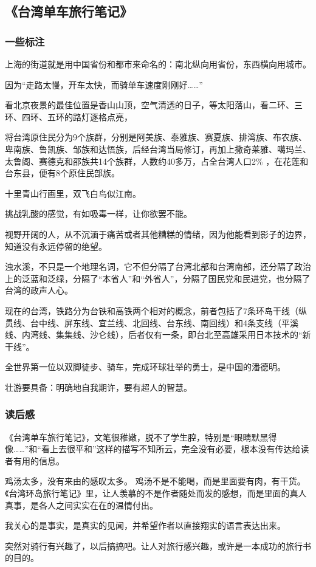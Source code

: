 \subsection{《台湾单车旅行笔记》}
\subsubsection{一些标注}

上海的街道就是用中国省份和都市来命名的：南北纵向用省份，东西横向用城市。

因为“走路太慢，开车太快，而骑单车速度刚刚好……”

看北京夜景的最佳位置是香山山顶，空气清透的日子，等太阳落山，看二环、三环、四环、五环的路灯逐格点亮，

将台湾原住民分为9个族群，分别是阿美族、泰雅族、赛夏族、排湾族、布农族、卑南族、鲁凯族、邹族和达悟族，后经台湾当局修订，再加上撒奇莱雅、噶玛兰、太鲁阁、赛德克和邵族共14个族群，人数约40多万，占全台湾人口2\% ，在花莲和台东县，便有8个原住民部族。

十里青山行画里，双飞白鸟似江南。

挑战乳酸的感觉，有如吸毒一样，让你欲罢不能。

视野开阔的人，从不沉湎于痛苦或者其他糟糕的情绪，因为他能看到影子的边界，知道没有永远停留的绝望。

浊水溪，不只是一个地理名词，它不但分隔了台湾北部和台湾南部，还分隔了政治上的泛蓝和泛绿，分隔了“本省人”和“外省人”，分隔了国民党和民进党，也分隔了台湾的政声人心。

现在的台湾，铁路分为台铁和高铁两个相对的概念，前者包括了7条环岛干线（纵贯线、台中线、屏东线、宜兰线、北回线、台东线、南回线）和4条支线（平溪线、内湾线、集集线、沙仑线），后者仅有一条，即台北至高雄采用日本技术的“新干线”。

全世界第一位以双脚徒步、骑车，完成环球壮举的勇士，是中国的潘德明。

壮游要具备：明确地自我期许，要有超人的智慧。

\subsubsection{读后感}

《台湾单车旅行笔记》，文笔很稚嫩，脱不了学生腔，特别是“眼睛默黑得像……”和“看上去很平和”这样的描写不知所云，完全没有必要，根本没有传达给读者有用的信息。

鸡汤太多，没有来由的感叹太多。 鸡汤不是不能喝，而是里面要有肉，有干货。《台湾环岛旅行笔记》里，让人羡慕的不是作者随处而发的感想，而是里面的真人真事，是各人之间实实在在的温情付出。

我关心的是事实，是真实的见闻，并希望作者以直接翔实的语言表达出来。

突然对骑行有兴趣了，以后搞搞吧。让人对旅行感兴趣，或许是一本成功的旅行书的目的。